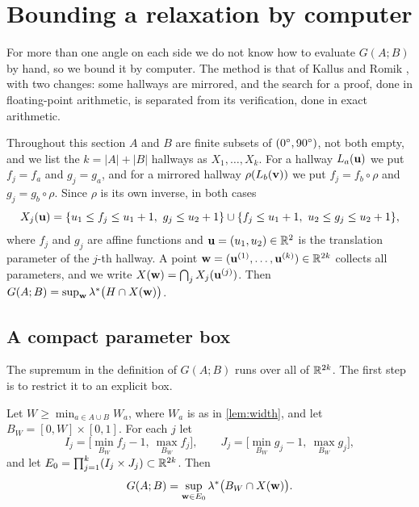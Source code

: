 \section{Bounding a relaxation by computer}\label{sec:method}

For more than one angle on each side we do not know how to evaluate $G(A;B)$ by hand, so we bound it by computer. The method is that of Kallus and Romik \cite[Sections~2--3]{kallusromik2018}, with two changes: some hallways are mirrored, and the search for a proof, done in floating-point arithmetic, is separated from its verification, done in exact arithmetic.

Throughout this section $A$ and $B$ are finite subsets of $(0^{\circ},90^{\circ})$, not both empty, and we list the $k=|A|+|B|$ hallways as $X_1,\dots,X_k$. For a hallway $L_a(\mathbf{u})$ we put $f_j=f_a$ and $g_j=g_a$, and for a mirrored hallway $\rho(L_b(\mathbf{v}))$ we put $f_j=f_b\circ\rho$ and $g_j=g_b\circ\rho$. Since $\rho$ is its own inverse, in both cases
\begin{equation}\label{eq:Xj}
X_j(\bu)=\{u_1\le f_j\le u_1+1,\ g_j\le u_2+1\}\cup\{f_j\le u_1+1,\ u_2\le g_j\le u_2+1\},
\end{equation}
where $f_j$ and $g_j$ are affine functions and $\mathbf{u}=(u_1,u_2)\in\mathbb{R}^2$ is the translation parameter of the $j$-th hallway. A point $\mathbf{w}=(\mathbf{u}^{(1)},\dots,\mathbf{u}^{(k)})\in\mathbb{R}^{2k}$ collects all parameters, and we write $X(\mathbf{w})=\bigcap_{j}X_j(\mathbf{u}^{(j)})$. Then $G(A;B)=\sup_{\mathbf{w}}\lambda^{*}\big(H\cap X(\mathbf{w})\big)$.


\subsection{A compact parameter box}

The supremum in the definition of $G(A;B)$ runs over all of $\mathbb{R}^{2k}$. The first step is to restrict it to an explicit box.

\begin{lem}[Normalisation]\label{lem:box}
Let $W\ge\min_{a\in A\cup B}W_a$, where $W_a$ is as in \cref{lem:width}, and let $B_W=[0,W]\times[0,1]$. For each $j$ let
\[
I_j=\big[\min_{B_W}f_j-1,\ \max_{B_W}f_j\big], \qquad J_j=\big[\min_{B_W}g_j-1,\ \max_{B_W}g_j\big],
\]
and let $E_0=\prod_{j=1}^k(I_j\times J_j)\subset\mathbb{R}^{2k}$. Then
\[
G(A;B)=\sup_{\mathbf{w}\in E_0}\lambda^{*}\big(B_W\cap X(\mathbf{w})\big).
\]
\end{lem}

